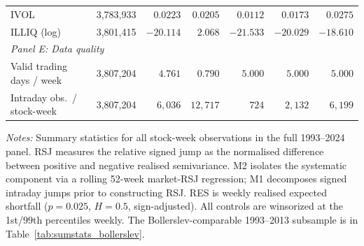 \documentclass[11pt,a4paper]{article}
\begin{document}
\begin{table}[!htbp]
\begin{threeparttable}
\begin{tabular}{l r r r r r r}
IVOL
  & 3{,}783{,}933 & $0.0223$ & $0.0205$ & $0.0112$ & $0.0173$ & $0.0275$ \\
ILLIQ (log)
  & 3{,}801{,}415 & $-20.114$& $2.068$  & $-21.533$& $-20.029$& $-18.610$\\[5pt]
\multicolumn{7}{l}{\textit{Panel E: Data quality}} \\[2pt]
Valid trading days / week
  & 3{,}807{,}204 & $4.761$ & $0.790$ & $5.000$ & $5.000$ & $5.000$ \\
Intraday obs.\ / stock-week
  & 3{,}807{,}204 & $6{,}036$ & $12{,}717$ & $724$ & $2{,}132$ & $6{,}199$ \\
\bottomrule
\end{tabular}
\begin{tablenotes}
\footnotesize
\item \textit{Notes:} Summary statistics for all stock-week observations in the full
1993--2024 panel. RSJ measures the relative signed jump as the normalised difference
between positive and negative realised semivariance. M2 isolates the systematic component
via a rolling 52-week market-RSJ regression; M1 decomposes signed intraday jumps prior
to constructing RSJ. RES is weekly realised expected shortfall ($p=0.025$, $H=0.5$,
sign-adjusted). All controls are winsorized at the 1st/99th percentiles weekly.
The Bollerslev-comparable 1993--2013 subsample is in Table~\ref{tab:sumstats_bollerslev}.
\end{tablenotes}
\end{threeparttable}
\end{table}
\end{document}
